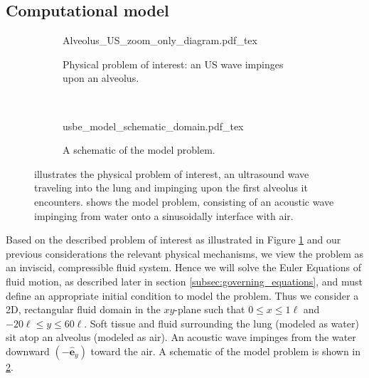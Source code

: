 \documentclass{jfm}%
\newcommand{\bs}[1]{\boldsymbol{#1}}
\begin{document}
\subsection{Computational model}
\label{subsec:setup}
%
\begin{figure}
  \centering
  \begin{subfigure}[b]{0.45\textwidth}
    \centering
    \def\svgwidth{\textwidth}
    {Alveolus_US_zoom_only_diagram.pdf_tex} \hfill%
    \caption{\label{fig:alveolar_schematic} Physical problem of interest: an \ac{US} wave impinges upon an alveolus.}
  \end{subfigure}
  ~
  \begin{subfigure}[b]{0.45\textwidth}
    \centering
    \def\svgwidth{\textwidth}
    {usbe_model_schematic_domain.pdf_tex} \hfill%
    \caption{\label{fig:problem_schematic} A schematic of the model problem.}
  \end{subfigure}
  \caption[A schematic view of the physical and model
  problems]{\protect{} illustrates the
    physical problem of interest, an ultrasound wave traveling into
    the lung and impinging upon the first alveolus it
    encounters.  shows the model
    problem, consisting of an acoustic wave impinging from water onto
    a sinusoidally interface with air.}
  \label{fig:schematics}
\end{figure}
% 
Based on the described problem of interest as illustrated in Figure
\ref{fig:alveolar_schematic} and our previous considerations the
relevant physical mechanisms, we view the problem as an inviscid,
compressible fluid system. Hence we will solve the Euler Equations of
fluid motion, as described later in section
\ref{subsec:governing_equations}, and must define an appropriate
initial condition to model the problem. Thus we consider a 2D,
rectangular fluid domain in the $xy$-plane such that
$0\leq x\leq 1\ell$ and $-20\ell\leq y\leq 60\ell$. Soft tissue and
fluid surrounding the lung (modeled as water) sit atop an alveolus
(modeled as air). An acoustic wave impinges from the water downward
$(-\bs{\hat{e}}_y)$ toward the air. A schematic of the model problem
is shown in \ref{fig:problem_schematic}.
\end{document}
